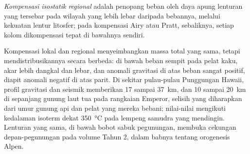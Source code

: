 \begin{definition}\label{def:b3:gravity-geodesy:regional}
\emph{Kompensasi isostatik regional}
adalah penopang beban oleh daya apung lenturan yang tersebar pada wilayah
yang lebih lebar daripada bebannya, melalui kekuatan lentur litosfer; pada kompensasi Airy
atau Pratt, sebaliknya, setiap kolom dikompensasi tepat di bawahnya sendiri.
\end{definition}

Kompensasi lokal dan regional menyeimbangkan massa total yang sama, tetapi mendistribusikannya
secara berbeda: di bawah beban sempit pada pelat kaku, akar lebih dangkal dan lebar,
dan anomali gravitasi di atas beban sangat positif, diapit anomali negatif
di atas parit. Di sekitar pulau-pulau Punggungan Hawaii, profil gravitasi dan
seismik memberikan  17 sampai \qty{37}{km}, dan
10 sampai \qty{20}{km} di sepanjang gunung laut tua pada rangkaian Emperor, selisih
yang diharapkan dari umur gunung api dan pelat yang mereka bebani; nilai-nilai
mengikuti kedalaman isoterm dekat
\qty{350}{\degreeCelsius} pada lempeng samudra yang mendingin.
Lenturan yang sama, di bawah bobot sabuk pegunungan, membuka cekungan
depan-pegunungan pada volume Tahun 2, dalam babnya tentang orogenesis Alpen.

